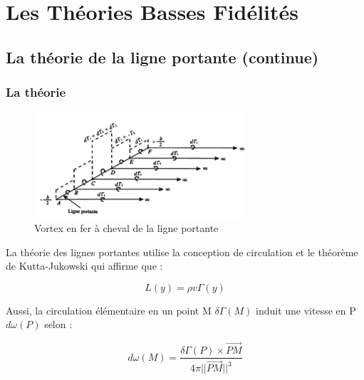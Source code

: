 \chapter{Les Théories Basses Fidélités}
\label{ch:Ch1}

\section{La théorie de la ligne portante (continue)} 
\label{sec:Ch1.1}

\subsection{La théorie} 
\label{subsec:Ch1.1.1}

\begin{figure}[H]
    \centering
    \includegraphics[width=0.7\textwidth]{Pics/01 - Basses Fidélités/Ligne portante.png}  
    \caption{Vortex en fer à cheval de la ligne portante}
    \label{fig:llt fer à cheval}
\end{figure}

La théorie des lignes portantes utilise la conception de circulation et le théorème de Kutta-Jukowski qui affirme que :

\begin{center}
    \begin{equation}
        L(y) = \rho v \Gamma(y)
        \label{eq:Cl_breukels}
    \end{equation}
\end{center}

Aussi, la circulation élémentaire en un point M $\delta\Gamma(M) $ induit une vitesse en P $d\omega(P) $ selon : 

\begin{center}
    \begin{equation}
        d\omega(M) = \frac{\delta\Gamma(P) \times \overrightarrow{PM}}{4\pi ||\overrightarrow{PM}||^3}
        \label{eq:v induite}
    \end{equation}
\end{center}

